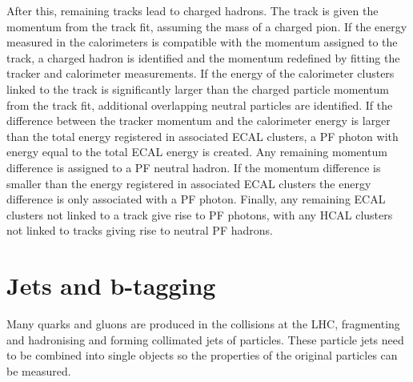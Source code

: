 After this, remaining tracks lead to charged hadrons. The track is
given the momentum from the track fit, assuming the mass of a charged pion. If
the energy measured in the calorimeters is compatible with the momentum assigned
to the track, a charged hadron is identified and the
momentum redefined by fitting the tracker and calorimeter measurements. If
the energy of the calorimeter clusters linked to the track is significantly larger than the
charged particle momentum from the track fit, additional overlapping neutral particles
are identified. If the difference between the tracker momentum and the calorimeter
energy is larger than the total energy registered in associated \ac{ECAL} clusters,
a \ac{PF} photon with energy equal to the total \ac{ECAL} energy is created.
Any remaining momentum difference is assigned to a \ac{PF} neutral hadron. If the momentum
difference is smaller than the energy registered in associated \ac{ECAL} clusters 
the energy difference is only associated with a \ac{PF} photon. %
Finally, any remaining \ac{ECAL} clusters not linked to a track give
rise to \ac{PF} photons, with any \ac{HCAL} clusters
not linked to tracks giving rise to neutral \ac{PF} hadrons.

\section{Jets and b-tagging}
\label{sec:objects_jets}
Many quarks and gluons are produced in the collisions at the \ac{LHC},
fragmenting and hadronising and forming collimated
jets of particles. These particle jets need to be combined
into single objects so the properties of the original particles can
be measured.


